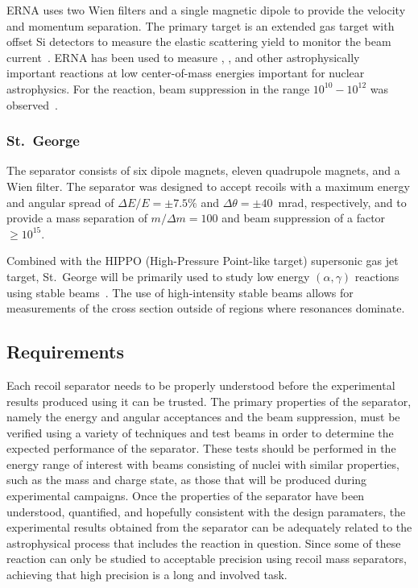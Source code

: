 ERNA uses two Wien filters and a single magnetic dipole to provide the
velocity and momentum separation. The primary target is an extended gas
target with offset Si detectors to measure the elastic scattering yield
to monitor the beam current~\cite{DiLeva2008}. ERNA has been used to
measure ,
, and other
astrophysically important reactions at low center-of-mass energies
important for nuclear astrophysics. For the
 reaction, beam
suppression in the range $10^{10} - 10^{12}$ was
observed~\cite{DiLeva2008}.

\subsubsection{St.\ George}
The separator consists of six dipole magnets, eleven quadrupole magnets,
and a Wien filter. The separator was designed to accept recoils with a
maximum energy and angular spread of $\Delta E/E = \pm7.5\%$ and
$\Delta\theta = \pm40$~mrad, respectively, and to provide a mass
separation of $m/\Delta m = 100$ and beam suppression of a factor $\geq
10^{15}$.

Combined with the HIPPO (High-Pressure Point-like target) supersonic gas
jet target, St.\ George will be primarily used to study low energy
$(\alpha,\gamma)$ reactions using stable beams~\cite{Kontos2012}. The
use of high-intensity stable beams allows for measurements of the cross
section outside of regions where resonances dominate.

\subsection{Requirements}

Each recoil separator needs to be properly understood before the
experimental results produced using it can be trusted. The primary
properties of the separator, namely the energy and angular acceptances
and the beam suppression, must be verified using a variety of techniques
and test beams in order to determine the expected performance of the
separator. These tests should be performed in the energy range of
interest with beams consisting of nuclei with similar properties, such
as the mass and charge state, as those that will be produced during
experimental campaigns. Once the properties of the separator have been
understood, quantified, and hopefully consistent with the design
paramaters, the experimental results obtained from the separator can be
adequately related to the astrophysical process that includes the
reaction in question. Since some of these reaction can only be studied
to acceptable precision using recoil mass separators, achieving that
high precision is a long and involved task.

